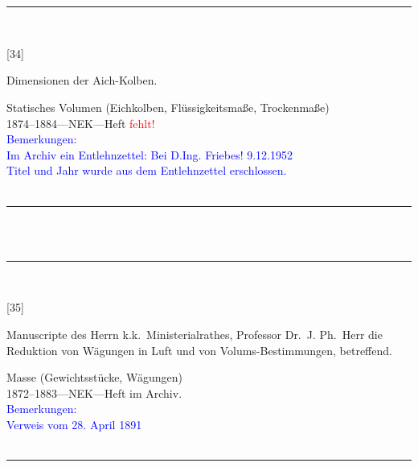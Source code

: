 \\
\vspace*{-2.5pt}\\
\parbox{\textwidth}{%
\rule{\textwidth}{1pt}\vspace*{-3mm}\\
\begin{minipage}[t]{0.15\textwidth}\vspace{0pt}
\Huge\rule[-4mm]{0cm}{1cm}[34]
\end{minipage}
\hfill
\begin{minipage}[t]{0.85\textwidth}\vspace{0pt}
\large Dimensionen der Aich-Kolben.\rule[-2mm]{0mm}{2mm}
\end{minipage}
{\footnotesize\flushright
Statisches Volumen (Eichkolben, Flüssigkeitsmaße, Trockenmaße)\\
}
1874--1884\quad---\quad NEK\quad---\quad Heft \textcolor{red}{fehlt!}\\
\textcolor{blue}{Bemerkungen:\\{}
Im Archiv ein Entlehnzettel: {\glqq}Bei D.Ing. Friebes! 9.12.1952{\grqq}\\{}
Titel und Jahr wurde aus dem Entlehnzettel erschlossen.\\{}
}
\\[-15pt]
\rule{\textwidth}{1pt}
}
\\
\vspace*{-2.5pt}\\
\parbox{\textwidth}{%
\rule{\textwidth}{1pt}\vspace*{-3mm}\\
\begin{minipage}[t]{0.15\textwidth}\vspace{0pt}
\Huge\rule[-4mm]{0cm}{1cm}[35]
\end{minipage}
\hfill
\begin{minipage}[t]{0.85\textwidth}\vspace{0pt}
\large Manuscripte des Herrn k.k.\ Ministerialrathes, Professor Dr.~J. Ph.\ Herr die Reduktion von Wägungen in Luft und von Volums-Bestimmungen, betreffend.\rule[-2mm]{0mm}{2mm}
\end{minipage}
{\footnotesize\flushright
Masse (Gewichtsstücke, Wägungen)\\
}
1872--1883\quad---\quad NEK\quad---\quad Heft im Archiv.\\
\textcolor{blue}{Bemerkungen:\\{}
Verweis vom 28. April 1891\\{}
}
\\[-15pt]
\rule{\textwidth}{1pt}
}
